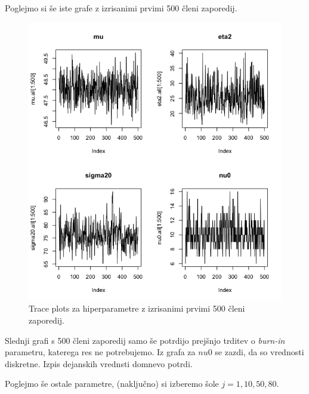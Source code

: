 \documentclass[a4paper,11pt]{article}
\begin{document}
\newpage
Poglejmo si še iste grafe z izrisanimi prvimi 500 členi zaporedij.

\begin{figure}[ht!]
    \centering
    \includegraphics[width = 150mm]{Slike/2_hiper_500.png}
    \caption{Trace plots za hiperparametre z izrisanimi prvimi 500 členi zaporedij.}
\end{figure}

\noindent
Slednji grafi s 500 členi zaporedij samo še potrdijo prejšnjo trditev o \textit{burn-in} parametru, katerega res ne potrebujemo.
Iz grafa za $nu0$ se zazdi, da so vrednosti diskretne. Izpis dejanskih vrednsti domnevo potrdi.

\newpage
Poglejmo še ostale parametre, (naključno) si izberemo šole $j = 1, 10, 50, 80$.
\end{document}
